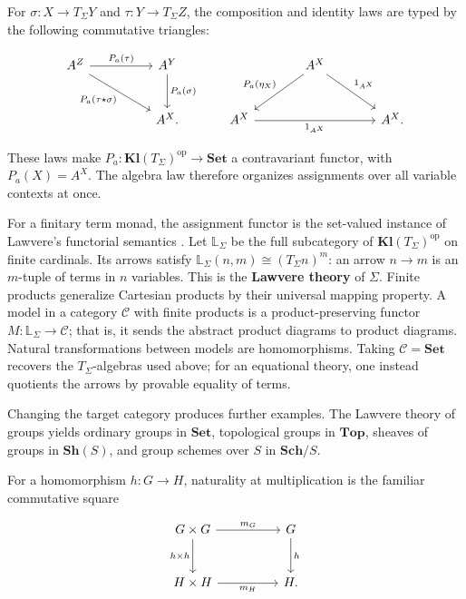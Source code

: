 \documentclass[11pt]{article}
\begin{document}
For
\(\sigma:X\to T_\Sigma Y\) and \(\tau:Y\to T_\Sigma Z\), the composition
and identity laws are typed by the following commutative triangles:

\[
\begin{tikzcd}[row sep=large,column sep=huge]
A^Z \arrow[r,"P_a(\tau)"]
  \arrow[dr,"P_a(\tau\star\sigma)"'] &
A^Y \arrow[d,"P_a(\sigma)"] \\
& A^X.
\end{tikzcd}
\qquad
\begin{tikzcd}[row sep=large,column sep=large]
& A^X \arrow[dl,"P_a(\eta_X)"'] \arrow[dr,"1_{A^X}"] & \\
A^X \arrow[rr,"1_{A^X}"'] && A^X.
\end{tikzcd}
\]

These laws make
\(P_a:\mathbf{Kl}(T_\Sigma)^{\mathrm{op}}\to\mathbf{Set}\) a contravariant
functor, with
\(P_a(X)=A^X\). The algebra law therefore organizes assignments over all
variable contexts at once.

For a finitary term monad, the assignment functor is the set-valued instance of
Lawvere's functorial semantics \cite{Lawvere1963}. Let \(\mathbb L_\Sigma\) be the full
subcategory of \(\mathbf{Kl}(T_\Sigma)^{\mathrm{op}}\) on finite cardinals.
Its arrows satisfy
\(\mathbb L_\Sigma(n,m)\cong(T_\Sigma n)^m\): an arrow \(n\to m\) is an
\(m\)-tuple of terms in \(n\) variables. This is the \textbf{Lawvere theory}
of \(\Sigma\). Finite products generalize Cartesian products by their universal
mapping property. A model in a category \(\mathcal C\) with finite products is
a product-preserving functor \(M:\mathbb L_\Sigma\to\mathcal C\); that is, it
sends the abstract product diagrams to product diagrams. Natural
transformations between models are homomorphisms. Taking
\(\mathcal C=\mathbf{Set}\) recovers the \(T_\Sigma\)-algebras used above;
for an equational theory, one instead quotients the arrows by provable equality
of terms.

Changing the target category produces further examples. The Lawvere
theory of groups yields ordinary groups in \(\mathbf{Set}\), topological
groups in \(\mathbf{Top}\), sheaves of groups in \(\mathbf{Sh}(S)\), and
group schemes over \(S\) in \(\mathbf{Sch}/S\).

For a homomorphism
\(h:G\to H\), naturality at multiplication is the familiar commutative
square

\[
\begin{tikzcd}[row sep=large,column sep=huge]
G\times G \arrow[r,"m_G"] \arrow[d,"h\times h"'] &
G \arrow[d,"h"] \\
H\times H \arrow[r,"m_H"'] & H .
\end{tikzcd}
\]
\end{document}
